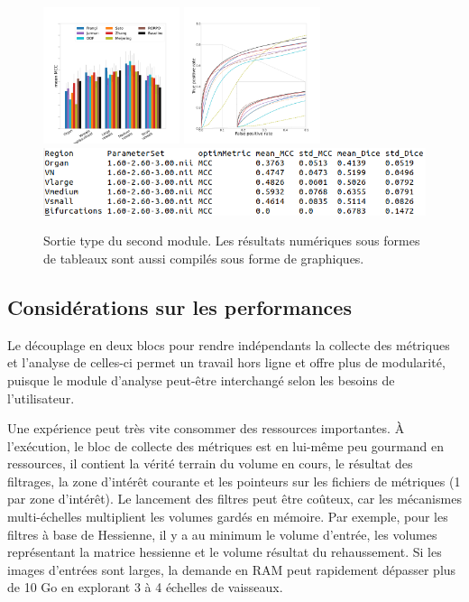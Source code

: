 \begin{figure}[h]
  \centering
  \includegraphics[height=4cm]{Images/bench_Ircad_PS_MCC.pdf}
  \includegraphics[height=4cm]{Images/bench_Ircad_ROC.pdf}
  \includegraphics[width=\textwidth]{Images/bench_type_of_results.png}
  \caption{Sortie type du second module. Les résultats numériques sous formes de tableaux sont aussi compilés sous forme de graphiques.}
  \label{fig:bench_module2}
\end{figure}

\subsection{Considérations sur les performances}

Le découplage en deux blocs pour rendre indépendants la collecte des métriques et l'analyse de celles-ci permet un travail hors ligne et offre plus de modularité, puisque le module d'analyse peut-être interchangé selon les besoins de l'utilisateur. 

Une expérience peut très vite consommer des ressources importantes. À l'exécution, le bloc de collecte des métriques est en lui-même peu gourmand en ressources, il contient la vérité terrain du volume en cours, le résultat des filtrages, la zone d'intérêt courante et les pointeurs sur les fichiers de métriques (1 par zone d'intérêt). Le lancement des filtres peut être coûteux, car les mécanismes multi-échelles multiplient les volumes gardés en mémoire. Par exemple, pour les filtres à base de Hessienne, il y a au minimum le volume d'entrée, les volumes représentant la matrice hessienne et le volume résultat du rehaussement. Si les images d'entrées sont larges, la demande en RAM peut rapidement dépasser plus de 10 Go en explorant 3 à 4 échelles de vaisseaux. 


